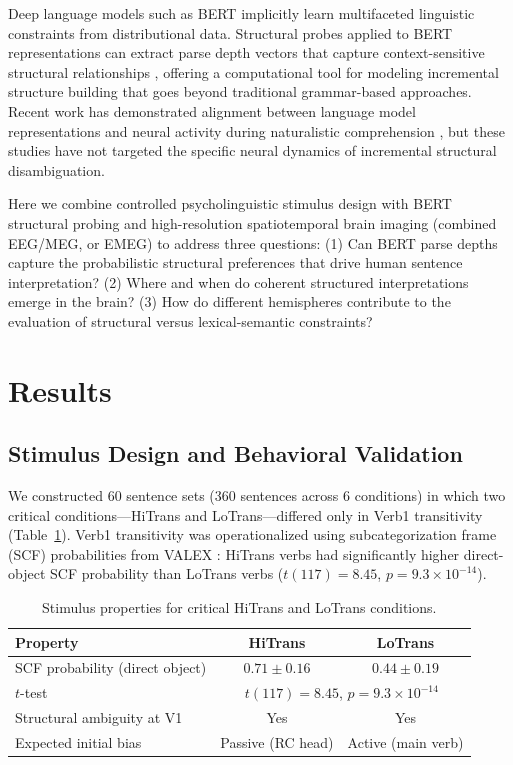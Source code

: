 \documentclass[11pt]{article}
\begin{document}
Deep language models such as BERT \citep{devlin2019bert} implicitly learn multifaceted linguistic constraints from distributional data. Structural probes applied to BERT representations can extract parse depth vectors that capture context-sensitive structural relationships \citep{hewitt2019structural}, offering a computational tool for modeling incremental structure building that goes beyond traditional grammar-based approaches. Recent work has demonstrated alignment between language model representations and neural activity during naturalistic comprehension \citep{schrimpf2021neural, caucheteux2022brains}, but these studies have not targeted the specific neural dynamics of incremental structural disambiguation.

Here we combine controlled psycholinguistic stimulus design with BERT structural probing and high-resolution spatiotemporal brain imaging (combined EEG/MEG, or EMEG) to address three questions: (1) Can BERT parse depths capture the probabilistic structural preferences that drive human sentence interpretation? (2) Where and when do coherent structured interpretations emerge in the brain? (3) How do different hemispheres contribute to the evaluation of structural versus lexical-semantic constraints?

\section{Results}

\subsection{Stimulus Design and Behavioral Validation}

We constructed 60 sentence sets (360 sentences across 6 conditions) in which two critical conditions---HiTrans and LoTrans---differed only in Verb1 transitivity (Table~\ref{tab:stimuli}). Verb1 transitivity was operationalized using subcategorization frame (SCF) probabilities from VALEX \citep{koller2003valex}: HiTrans verbs had significantly higher direct-object SCF probability than LoTrans verbs ($t(117) = 8.45$, $p = 9.3 \times 10^{-14}$).

\begin{table}[H]
\centering
\caption{Stimulus properties for critical HiTrans and LoTrans conditions.}
\label{tab:stimuli}
\begin{tabular}{lcc}
\toprule
\textbf{Property} & \textbf{HiTrans} & \textbf{LoTrans} \\
\midrule
SCF probability (direct object) & $0.71 \pm 0.16$ & $0.44 \pm 0.19$ \\
$t$-test & \multicolumn{2}{c}{$t(117) = 8.45$, $p = 9.3 \times 10^{-14}$} \\
Structural ambiguity at V1 & Yes & Yes \\
Expected initial bias & Passive (RC head) & Active (main verb) \\
\bottomrule
\end{tabular}
\end{table}
\end{document}
